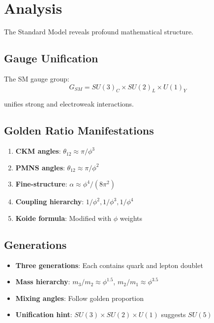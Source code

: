 \section{Analysis}

The Standard Model reveals profound mathematical structure.

\subsection{Gauge Unification}

\begin{theorem}
\label{fa_20:thm:sm-symmetry}
The SM gauge group:
\begin{equation}
G_{SM} = SU(3)_C \times SU(2)_L \times U(1)_Y
\end{equation}

unifies strong and electroweak interactions.
\end{theorem}

\subsection{Golden Ratio Manifestations}

\begin{enumerate}
\item \textbf{CKM angles}: $\theta_{12} \approx \pi/\phi^3$
\item \textbf{PMNS angles}: $\theta_{12} \approx \pi/\phi^2$
\item \textbf{Fine-structure}: $\alpha \approx \phi^4/(8\pi^2)$
\item \textbf{Coupling hierarchy}: $1/\phi^2, 1/\phi^3, 1/\phi^4$
\item \textbf{Koide formula}: Modified with $\phi$ weights
\end{enumerate}

\subsection{Generations}

\begin{itemize}
\item \textbf{Three generations}: Each contains quark and lepton doublet
\item \textbf{Mass hierarchy}: $m_3/m_2 \approx \phi^{1.5}$, $m_2/m_1 \approx \phi^{3.5}$
\item \textbf{Mixing angles}: Follow golden proportion
\item \textbf{Unification hint}: $SU(3) \times SU(2) \times U(1)$ suggests $SU(5)$
\end{itemize}

